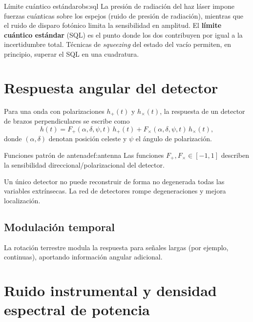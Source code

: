 \begin{observacion}{Límite cuántico estándar}{obs:sql}
La presión de radiación del haz láser impone fuerzas cuánticas sobre los espejos (ruido de presión de radiación), mientras que el ruido de disparo fotónico limita la sensibilidad en amplitud. El \textbf{límite cuántico estándar} (SQL) es el punto donde los dos contribuyen por igual a la incertidumbre total. Técnicas de \emph{squeezing} del estado del vacío permiten, en principio, superar el SQL en una cuadratura.
\end{observacion}

\section{Respuesta angular del detector}
\label{sec:respuesta_angular}

Para una onda con polarizaciones $h_+(t)$ y $h_\times(t)$, la respuesta de un detector de brazos perpendiculares se escribe como
\begin{equation}
h(t)=F_+(\alpha,\delta,\psi,t)\,h_+(t)+F_\times(\alpha,\delta,\psi,t)\,h_\times(t),
\label{eq:detector_response}
\end{equation}
donde $(\alpha,\delta)$ denotan posición celeste y $\psi$ el ángulo de polarización.

\begin{definicion}{Funciones patrón de antena}{def:antenna}
Las funciones $F_+,F_\times\in[-1,1]$ describen la sensibilidad direccional/polarizacional del detector.
\end{definicion}

\begin{importante}
Un único detector no puede reconstruir de forma no degenerada todas las variables extrínsecas. La red de detectores rompe degeneraciones y mejora localización.
\end{importante}

\subsection{Modulación temporal}

La rotación terrestre modula la respuesta para señales largas (por ejemplo, continuas), aportando información angular adicional.

\section{Ruido instrumental y densidad espectral de potencia}
\label{sec:ruido_psd}


